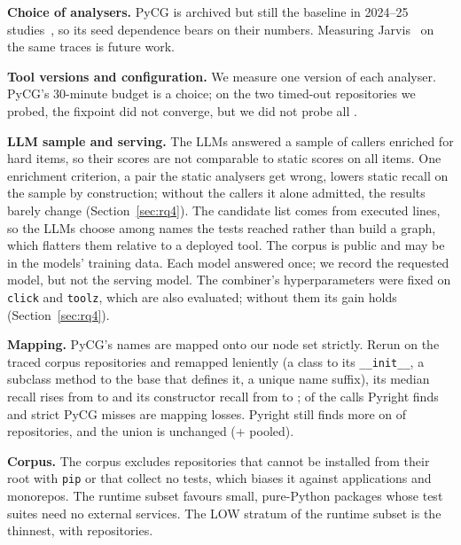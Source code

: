 \documentclass[conference]{IEEEtran}
\begin{document}
\textbf{Choice of analysers.} PyCG is archived but still the baseline in 2024--25
studies~\cite{bouzenia2024dypybench,venkatesh2025llmcg}, so its seed dependence bears on their
numbers. Measuring Jarvis~\cite{huang2023jarvis} on the same traces is future work.

\textbf{Tool versions and configuration.} We measure one version of each analyser. PyCG's 30-minute budget is a choice; on the two timed-out repositories we probed, the fixpoint
did not converge, but we did not probe all \nFailTimeout{}.

\textbf{LLM sample and serving.} The LLMs answered a sample of callers enriched for hard items, so
their scores are not comparable to static scores on all items. One enrichment criterion, a pair the static analysers get wrong,
lowers static recall on the sample by construction; without the callers it alone admitted, the
results barely change (Section~\ref{sec:rq4}). The candidate list comes from executed lines,
so the LLMs choose among names the tests reached rather than build a graph, which flatters them
relative to a deployed tool. The corpus is public and may be in the
models' training data. Each model answered once; we record the requested model, but not
the serving model. The combiner's hyperparameters were fixed on \texttt{click} and \texttt{toolz},
which are also evaluated; without them its gain holds (Section~\ref{sec:rq4}).

\textbf{Mapping.} PyCG's names are mapped onto our node set strictly. Rerun on the \nMapRepos{}
traced corpus repositories and remapped leniently (a class to its \texttt{\_\_init\_\_}, a subclass
method to the base that defines it, a unique name suffix), its median recall rises from
\mapMedStrict{} to \mapMedLenient{} and its constructor recall from \mapCtorStrict{} to
\mapCtorLenient; \pctMapLoss{} of the calls Pyright finds and strict PyCG misses are mapping losses.
Pyright still finds more on \mapPyrWinsLenient{} of \nMapRepos{} repositories, and the union is
unchanged (+\mapUnionPoolDelta{} pooled).

\textbf{Corpus.} The corpus excludes repositories that cannot be installed from their root with
\texttt{pip} or that collect no tests, which biases it against applications and monorepos. The
runtime subset favours small, pure-Python packages whose test suites need no external services.
The LOW stratum of the runtime subset is the thinnest, with \nLowRuntime{} repositories.

\end{document}
